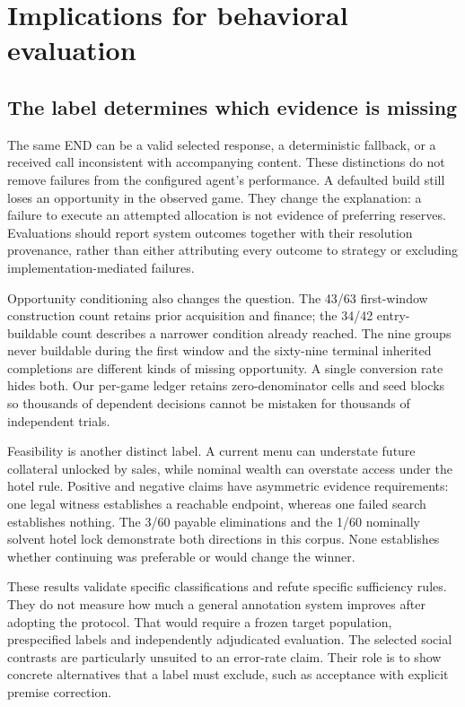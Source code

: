 \section{Implications for behavioral evaluation}
\label{sec:discussion}

\subsection{The label determines which evidence is missing}

The same END can be a valid selected response, a deterministic fallback, or a received call inconsistent with accompanying content. These distinctions do not remove failures from the configured agent's performance. A defaulted build still loses an opportunity in the observed game. They change the explanation: a failure to execute an attempted allocation is not evidence of preferring reserves. Evaluations should report system outcomes together with their resolution provenance, rather than either attributing every outcome to strategy or excluding implementation-mediated failures.

Opportunity conditioning also changes the question. The 43/63 first-window construction count retains prior acquisition and finance; the 34/42 entry-buildable count describes a narrower condition already reached. The nine groups never buildable during the first window and the sixty-nine terminal inherited completions are different kinds of missing opportunity. A single conversion rate hides both. Our per-game ledger retains zero-denominator cells and seed blocks so thousands of dependent decisions cannot be mistaken for thousands of independent trials.

Feasibility is another distinct label. A current menu can understate future collateral unlocked by sales, while nominal wealth can overstate access under the hotel rule. Positive and negative claims have asymmetric evidence requirements: one legal witness establishes a reachable endpoint, whereas one failed search establishes nothing. The 3/60 payable eliminations and the 1/60 nominally solvent hotel lock demonstrate both directions in this corpus. None establishes whether continuing was preferable or would change the winner.

These results validate specific classifications and refute specific sufficiency rules. They do not measure how much a general annotation system improves after adopting the protocol. That would require a frozen target population, prespecified labels and independently adjudicated evaluation. The selected social contrasts are particularly unsuited to an error-rate claim. Their role is to show concrete alternatives that a label must exclude, such as acceptance with explicit premise correction.

